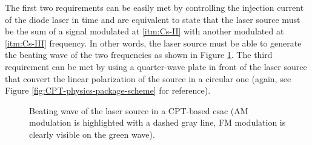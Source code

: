 The first two requirements can be easily met by controlling the injection current of the diode laser in time and are equivalent to state that the laser source must be the sum of a signal modulated at \ref{itm:Cs-II} with another modulated at \ref{itm:Cs-III} frequency.
In other words, the laser source must be able to generate the beating wave of the two frequencies as shown in Figure \ref{fig:beating-wave}.
The third requirement can be met by using a quarter-wave plate in front of the laser source that convert the linear polarization of the source in a circular one (again, see Figure \ref{fig:CPT-physics-package-scheme} for reference).

\begin{figure}[H]
    \centering


    \caption{Beating wave of the laser source in a CPT-based \acrshort{csac} (AM modulation is highlighted with a dashed gray line, FM modulation is clearly visible on the green wave).}
    \label{fig:beating-wave}
\end{figure}

